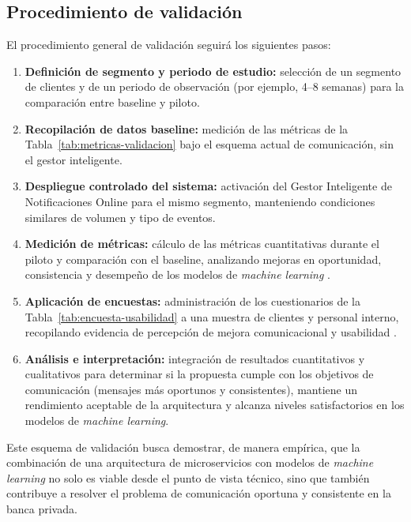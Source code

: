 \documentclass[conference]{IEEEtran}
\begin{document}
\subsection{Procedimiento de validaci{\'o}n}

El procedimiento general de validaci{\'o}n seguir{\'a} los siguientes pasos:

\begin{enumerate}
  \item \textbf{Definici{\'o}n de segmento y periodo de estudio:} selecci{\'o}n de un segmento de clientes y de un periodo de observaci{\'o}n (por ejemplo, 4--8 semanas) para la comparaci{\'o}n entre baseline y piloto.
  \item \textbf{Recopilaci{\'o}n de datos baseline:} medici{\'o}n de las m{\'e}tricas de la Tabla~\ref{tab:metricas-validacion} bajo el esquema actual de comunicaci{\'o}n, sin el gestor inteligente.
  \item \textbf{Despliegue controlado del sistema:} activaci{\'o}n del Gestor Inteligente de Notificaciones Online para el mismo segmento, manteniendo condiciones similares de volumen y tipo de eventos.
  \item \textbf{Medici{\'o}n de m{\'e}tricas:} c{\'a}lculo de las m{\'e}tricas cuantitativas durante el piloto y comparaci{\'o}n con el baseline, analizando mejoras en oportunidad, consistencia y desempe{\~n}o de los modelos de \textit{machine learning} \cite{yancey2020,prabhakar2022}.
  \item \textbf{Aplicaci{\'o}n de encuestas:} administraci{\'o}n de los cuestionarios de la Tabla~\ref{tab:encuesta-usabilidad} a una muestra de clientes y personal interno, recopilando evidencia de percepci{\'o}n de mejora comunicacional y usabilidad \cite{lopez2020,twilio2023}.
  \item \textbf{An{\'a}lisis e interpretaci{\'o}n:} integraci{\'o}n de resultados cuantitativos y cualitativos para determinar si la propuesta cumple con los objetivos de comunicaci{\'o}n (mensajes m{\'a}s oportunos y consistentes), mantiene un rendimiento aceptable de la arquitectura y alcanza niveles satisfactorios en los modelos de \textit{machine learning}.
\end{enumerate}

Este esquema de validaci{\'o}n busca demostrar, de manera emp{\'i}rica, que la combinaci{\'o}n de una arquitectura de microservicios con modelos de \textit{machine learning} no solo es viable desde el punto de vista t{\'e}cnico, sino que tambi{\'e}n contribuye a resolver el problema de comunicaci{\'o}n oportuna y consistente en la banca privada.
\end{document}
